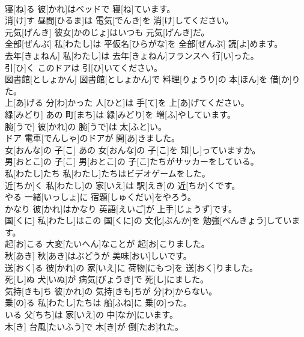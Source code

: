 \documentclass[8pt]{extreport}
\begin{document}
\begin{CJK}{UTF8}{min}
\\	寝[ね]る	彼[かれ]はベッドで 寝[ね]ています。		
\\	消[け]す	昼間[ひるま]は 電気[でんき]を 消[け]してください。		
\\	元気[げんき]	彼女[かのじょ]はいつも 元気[げんき]だ。		
\\	全部[ぜんぶ]	私[わたし]は 平仮名[ひらがな]を 全部[ぜんぶ] 読[よ]めます。		
\\	去年[きょねん]	私[わたし]は 去年[きょねん]フランスへ 行[い]った。		
\\	引[ひ]く	このドアは 引[ひ]いてください。		
\\	図書館[としょかん]	図書館[としょかん]で 料理[りょうり]の 本[ほん]を 借[か]りた。		
\\	上[あ]げる	分[わ]かった 人[ひと]は 手[て]を 上[あ]げてください。		
\\	緑[みどり]	あの 町[まち]は 緑[みどり]を 増[ふ]やしています。		
\\	腕[うで]	彼[かれ]の 腕[うで]は 太[ふと]い。		
\\	ドア	電車[でんしゃ]のドアが 開[あ]きました。		
\\	女[おんな]の 子[こ]	あの 女[おんな]の 子[こ]を 知[し]っていますか。		
\\	男[おとこ]の 子[こ]	男[おとこ]の 子[こ]たちがサッカーをしている。		
\\	私[わたし]たち	私[わたし]たちはビデオゲームをした。		
\\	近[ちか]く	私[わたし]の 家[いえ]は 駅[えき]の 近[ちか]くです。		
\\	やる	一緒[いっしょ]に 宿題[しゅくだい]をやろう。		
\\	かなり	彼[かれ]はかなり 英語[えいご]が 上手[じょうず]です。		
\\	国[くに]	私[わたし]はこの 国[くに]の 文化[ぶんか]を 勉強[べんきょう]しています。		
\\	起[お]こる	大変[たいへん]なことが 起[お]こりました。		
\\	秋[あき]	秋[あき]はぶどうが 美味[おい]しいです。		
\\	送[おく]る	彼[かれ]の 家[いえ]に 荷物[にもつ]を 送[おく]りました。		
\\	死[し]ぬ	犬[いぬ]が 病気[びょうき]で 死[し]にました。		
\\	気持[きも]ち	彼[かれ]の 気持[きも]ちが 分[わ]からない。		
\\	乗[の]る	私[わたし]たちは 船[ふね]に 乗[の]った。		
\\	いる	父[ちち]は 家[いえ]の 中[なか]にいます。		
\\	木[き]	台風[たいふう]で 木[き]が 倒[たお]れた。		

\end{CJK}
\end{document}
